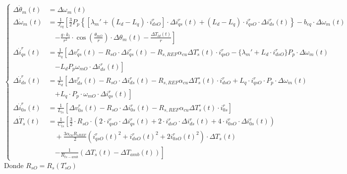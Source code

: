\documentclass[12pt, a4paper,journal, onecolumn, compsoc]{IEEEtran}
\begin{document}
\begin{equation*}
\left\{
    \begin{aligned}
        \Delta \dot{\theta}_m(t) &= \Delta \omega_m(t) \\[10pt]
        \Delta \dot{\omega}_m(t) &= \frac{1}{J_{eq}} \left[ \frac{3}{2} P_p \left\{ [\lambda_m' + (L_d - L_q) \cdot i_{dsO}^r] \cdot \Delta i_{qs}^r(t) + (L_d - L_q) \cdot i_{qsO}^r \cdot \Delta i_{ds}^r(t) \right\} - b_{eq} \cdot \Delta \omega_m(t) \right. \\
        &\quad \left. - \frac{g \cdot k_l}{r^2} \cdot \cos\left(\frac{\theta_{mO}}{r}\right) \cdot \Delta \theta_m(t) - \frac{\Delta T_{ld}(t)}{r} \right] \\[10pt]
        \Delta \dot{i}_{qs}^r(t) &= \frac{1}{L_q} \left[ \Delta v_{qs}^r(t) - R_{sO} \cdot \Delta i_{qs}^r(t) - R_{s,REF} \alpha_{cu} \Delta T_s^\circ(t) \cdot i_{qsO}^r - \{\lambda_m' + L_d \cdot i_{dsO}^r\} P_p \cdot \Delta \omega_m(t) \right. \\
        &\quad \left. - L_d P_p \omega_{mO} \cdot \Delta i_{ds}^r(t) \right] \\[10pt]
        \Delta \dot{i}_{ds}^r(t) &= \frac{1}{L_d} \left[ \Delta v_{ds}^r(t) - R_{sO} \cdot \Delta i_{ds}^r(t) - R_{s,REF} \alpha_{cu} \Delta T_s^\circ(t) \cdot i_{dsO}^r + L_q \cdot i_{qsO}^r \cdot P_p \cdot \Delta \omega_m(t) \right. \\
        &\quad \left. + L_q \cdot P_p \cdot \omega_{mO} \cdot \Delta i_{qs}^r(t) \right] \\[10pt]
        \Delta \dot{i}_{0s}^r(t) &= \frac{1}{L_{ls}} \left[ \Delta v_{0s}^r(t) - R_{sO} \cdot \Delta i_{0s}^r(t) - R_{s,REF} \alpha_{cu} \Delta T_s^\circ(t) \cdot i_{0s}^r \right] \\[10pt]
        \Delta \dot{T}_s(t) &= \frac{1}{C_{ts}} \left[ \frac{3}{2} \cdot R_{sO} \cdot (2 \cdot i_{qsO}^r \cdot \Delta i_{qs}^r(t) + 2 \cdot i_{dsO}^r \cdot \Delta i_{ds}^r(t) + 4 \cdot i_{0sO}^r \cdot \Delta i_{0s}^r(t)) \right. \\
        &\quad + \frac{3 \alpha_{cu} R_{sREF}}{2} (i_{qsO}^r(t)^2 + i_{dsO}^r(t)^2 + 2i_{0sO}^r(t)^2) \cdot \Delta T_s(t) \\
        &\quad \left. - \frac{1}{R_{ts-amb}} (\Delta T_s(t) - \Delta T_{amb}(t)) \right]
    \end{aligned}
\right.
\end{equation*}
Donde \(R_{sO}=R_s(T^\circ_{sO})\)
\end{document}
